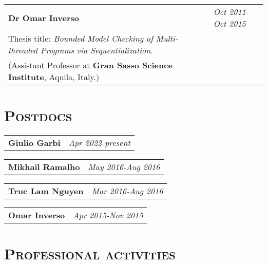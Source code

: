 \begin{resume}
\begin{tabular}{@{}p{4.6in}p{1.8in}}
{\bf Dr Omar Inverso } & \emph{Oct 2011-Oct 2015}  \\
Thesis title: {\em Bounded Model Checking of Multi-threaded Programs via Sequentialization}.\\
(Assistant Professor at {\bf Gran Sasso Science Institute}, Aquila, Italy.) 
\end{tabular}




\section{\bfseries \scshape  Postdocs}

\begin{tabular}{@{}p{4.6in}p{1.8in}}
{\bf Giulio Garbi } & \emph{Apr 2022-present}  \\
\end{tabular}

\begin{tabular}{@{}p{4.6in}p{1.8in}}
{\bf Mikhail Ramalho } & \emph{May 2016-Aug 2016}  \\
\end{tabular}

\begin{tabular}{@{}p{4.6in}p{1.8in}}
{\bf Truc Lam Nguyen } & \emph{Mar 2016-Aug 2016}  \\
\end{tabular}

\begin{tabular}{@{}p{4.6in}p{1.8in}}
{\bf Omar Inverso } & \emph{Apr 2015-Nov 2015}  \\
\end{tabular}





\section{\bfseries \scshape  Professional activities }



\end{resume}
